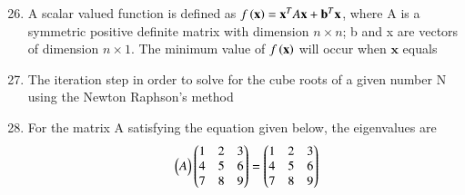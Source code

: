 \documentclass[journal,12pt,onecolumn]{IEEEtran}
\theoremstyle{remark}
\begin{document}
\clearpage
\begin{enumerate}
\setcounter{enumi}{25}
    \item A scalar valued function is defined as $f\left(\mathbf{x}\right) = \mathbf{x}^T A \mathbf{x} + \mathbf{b}^T \mathbf{x}$, where A is a symmetric positive definite matrix with dimension $n \times n$; b and x are vectors of dimension $n \times 1$. The minimum value of $f\left(\mathbf{x}\right)$ will occur when $\mathbf{x}$ equals
    
    \hfill{}
        \begin{enumerate}
        \end{enumerate}

    \item The iteration step in order to solve for the cube roots of a given number N using the Newton Raphson's method

    \hfill{}
        \begin{enumerate}
        \end{enumerate}
    
    \item For the matrix A satisfying the equation given below, the eigenvalues are
    $$
        \begin{pmatrix}A\end{pmatrix}\begin{pmatrix}1 & 2 & 3 \\ 4 & 5 & 6 \\ 7 & 8 & 9\end{pmatrix}
         = \begin{pmatrix}1 & 2 & 3 \\ 4 & 5 & 6 \\ 7 & 8 & 9 \end{pmatrix}
    $$

    \hfill{}
        \begin{enumerate}
        \end{enumerate}
    

\end{enumerate}
\end{document}
